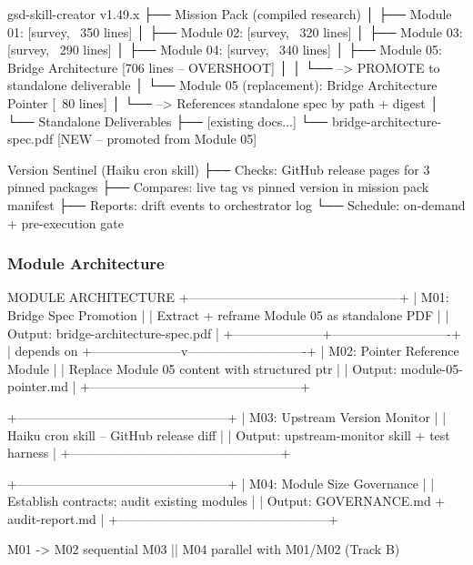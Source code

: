 \documentclass[11pt,letterpaper]{article}
\begin{document}
\begin{asciibox}
gsd-skill-creator v1.49.x
├── Mission Pack (compiled research)
│   ├── Module 01: [survey, ~350 lines]
│   ├── Module 02: [survey, ~320 lines]
│   ├── Module 03: [survey, ~290 lines]
│   ├── Module 04: [survey, ~340 lines]
│   ├── Module 05: Bridge Architecture [706 lines -- OVERSHOOT]
│   │   └── --> PROMOTE to standalone deliverable
│   └── Module 05 (replacement): Bridge Architecture Pointer [~80 lines]
│       └── --> References standalone spec by path + digest
│
└── Standalone Deliverables
    ├── [existing docs...]
    └── bridge-architecture-spec.pdf  [NEW -- promoted from Module 05]

Version Sentinel (Haiku cron skill)
├── Checks:  GitHub release pages for 3 pinned packages
├── Compares: live tag vs pinned version in mission pack manifest
├── Reports: drift events to orchestrator log
└── Schedule: on-demand + pre-execution gate
\end{asciibox}

\subsubsection{Module Architecture}

\begin{asciibox}
                    MODULE ARCHITECTURE
    +--------------------------------------------------+
    |  M01: Bridge Spec Promotion                      |
    |  Extract + reframe Module 05 as standalone PDF   |
    |  Output: bridge-architecture-spec.pdf            |
    +---------------------+----------------------------+
                          | depends on
    +---------------------v----------------------------+
    |  M02: Pointer Reference Module                   |
    |  Replace Module 05 content with structured ptr   |
    |  Output: module-05-pointer.md                    |
    +--------------------------------------------------+

    +--------------------------------------------------+
    |  M03: Upstream Version Monitor                   |
    |  Haiku cron skill -- GitHub release diff         |
    |  Output: upstream-monitor skill + test harness   |
    +--------------------------------------------------+

    +--------------------------------------------------+
    |  M04: Module Size Governance                     |
    |  Establish contracts; audit existing modules     |
    |  Output: GOVERNANCE.md + audit-report.md         |
    +--------------------------------------------------+

    M01 -> M02 sequential
    M03 || M04 parallel with M01/M02 (Track B)
\end{asciibox}
\end{document}
